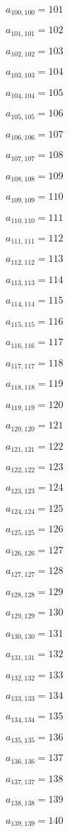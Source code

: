 \documentclass[a4paper,12pt]{article}
\begin{document}
$a _{ 100, 100 } = 101$

$a _{ 101, 101 } = 102$

$a _{ 102, 102 } = 103$

$a _{ 103, 103 } = 104$

$a _{ 104, 104 } = 105$

$a _{ 105, 105 } = 106$

$a _{ 106, 106 } = 107$

$a _{ 107, 107 } = 108$

$a _{ 108, 108 } = 109$

$a _{ 109, 109 } = 110$

$a _{ 110, 110 } = 111$

$a _{ 111, 111 } = 112$

$a _{ 112, 112 } = 113$

$a _{ 113, 113 } = 114$

$a _{ 114, 114 } = 115$

$a _{ 115, 115 } = 116$

$a _{ 116, 116 } = 117$

$a _{ 117, 117 } = 118$

$a _{ 118, 118 } = 119$

$a _{ 119, 119 } = 120$

$a _{ 120, 120 } = 121$

$a _{ 121, 121 } = 122$

$a _{ 122, 122 } = 123$

$a _{ 123, 123 } = 124$

$a _{ 124, 124 } = 125$

$a _{ 125, 125 } = 126$

$a _{ 126, 126 } = 127$

$a _{ 127, 127 } = 128$

$a _{ 128, 128 } = 129$

$a _{ 129, 129 } = 130$

$a _{ 130, 130 } = 131$

$a _{ 131, 131 } = 132$

$a _{ 132, 132 } = 133$

$a _{ 133, 133 } = 134$

$a _{ 134, 134 } = 135$

$a _{ 135, 135 } = 136$

$a _{ 136, 136 } = 137$

$a _{ 137, 137 } = 138$

$a _{ 138, 138 } = 139$

$a _{ 139, 139 } = 140$
\end{document}
